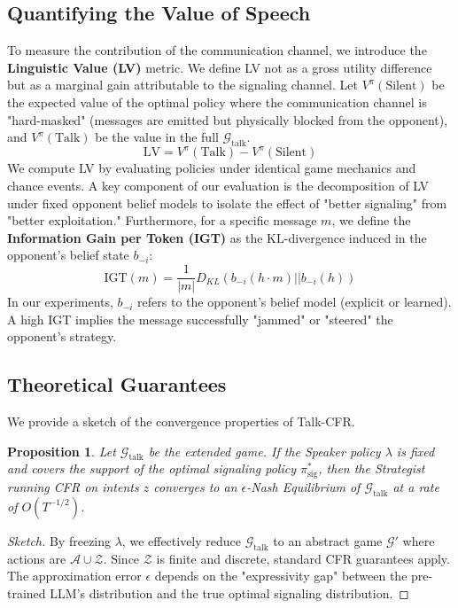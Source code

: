 \documentclass{article}
\begin{document}
\subsection{Quantifying the Value of Speech}
To measure the contribution of the communication channel, we introduce the \textbf{Linguistic Value (LV)} metric. We define LV not as a gross utility difference but as a marginal gain attributable to the signaling channel.
Let $V^{\pi}(\text{Silent})$ be the expected value of the optimal policy where the communication channel is "hard-masked" (messages are emitted but physically blocked from the opponent), and $V^{\pi}(\text{Talk})$ be the value in the full $\mathcal{G}_{\text{talk}}$.
\begin{equation}
    \text{LV} = V^{\pi}(\text{Talk}) - V^{\pi}(\text{Silent})
\end{equation}
We compute LV by evaluating policies under identical game mechanics and chance events. A key component of our evaluation is the decomposition of LV under fixed opponent belief models to isolate the effect of "better signaling" from "better exploitation."
Furthermore, for a specific message $m$, we define the \textbf{Information Gain per Token (IGT)} as the KL-divergence induced in the opponent's belief state $b_{-i}$:
\begin{equation}
    \text{IGT}(m) = \frac{1}{|m|} D_{KL} \left( b_{-i}(h \cdot m) || b_{-i}(h) \right)
\end{equation}
In our experiments, $b_{-i}$ refers to the opponent's belief model (explicit or learned).
A high IGT implies the message successfully "jammed" or "steered" the opponent's strategy.

\subsection{Theoretical Guarantees}
We provide a sketch of the convergence properties of Talk-CFR.
\newtheorem{proposition}{Proposition}
\begin{proposition}
Let $\mathcal{G}_{\text{talk}}$ be the extended game. If the Speaker policy $\lambda$ is fixed and covers the support of the optimal signaling policy $\pi^*_{\text{sig}}$, then the Strategist running CFR on intents $z$ converges to an $\epsilon$-Nash Equilibrium of $\mathcal{G}_{\text{talk}}$ at a rate of $O(T^{-1/2})$.
\end{proposition}
\begin{proof}[Sketch]
By freezing $\lambda$, we effectively reduce $\mathcal{G}_{\text{talk}}$ to an abstract game $\mathcal{G}'$ where actions are $\mathcal{A} \cup \mathcal{Z}$. Since $\mathcal{Z}$ is finite and discrete, standard CFR guarantees apply. The approximation error $\epsilon$ depends on the "expressivity gap" between the pre-trained LLM's distribution and the true optimal signaling distribution.
\end{proof}
\end{document}
